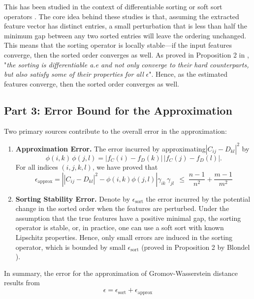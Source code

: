 \documentclass{article}
\begin{document}
This has been studied in the context of differentiable sorting or soft sort operators \cite{prillo2020softsort, blondel2020fast}. The core idea behind these studies is that, assuming the extracted feature vector has distinct entries, a small perturbation that is less than half the minimum gap between any two sorted entries will leave the ordering unchanged. This means that the sorting operator is locally stable—if the input features converge, then the sorted order converges as well. As proved in Proposition 2 in \cite{blondel2020fast}, "\textit{the sorting is differentiable a.e and not only converge to their hard counterparts, but also satisfy some of their properties for all} $\epsilon$". Hence, as the estimated features converge, then the sorted order converges as well.

\subsection{Part 3: Error Bound for the Approximation}

Two primary sources contribute to the overall error in the approximation:
\begin{enumerate}
    \item \textbf{Approximation Error.} The error incurred by approximating$\left|C_{ij} - D_{kl}\right|^2$
    by
    \[
    \phi(i,k) \, \phi(j,l) = \bigl| f_C(i)-f_D(k) \bigr|\, \bigl| f_C(j)-f_D(l) \bigr|.
    \]
    For all indices $(i,j,k,l)$, we have proved that
    \[
    \epsilon_{\mathrm{approx}} = \left|\left|C_{ij}-D_{kl}\right|^2 - \phi(i,k)\phi(j,l)\right|\gamma_{ik} \, \gamma_{jl}\,
    \;\le\;
    \frac{n-1}{n^2} + \frac{m-1}{m^2}
    \]

    \item \textbf{Sorting Stability Error.} Denote by $\epsilon_{\mathrm{sort}}$ the error incurred by the potential change in the sorted order when the features are perturbed. Under the assumption that the true features have a positive minimal gap, the sorting operator is stable, or, in practice, one can use a soft sort with known Lipschitz properties. Hence, only small errors are induced in the sorting operator, which is bounded by small $\epsilon_{\mathrm{sort}}$ (proved in Proposition 2 by Blondel \cite{blondel2020fast}).
\end{enumerate}
In summary, the error for the approximation of Gromov-Wasserstein distance results from 
\[
\epsilon = \epsilon_{\mathrm{sort}} +  \epsilon_{\mathrm{approx}}
\]

\end{document}
